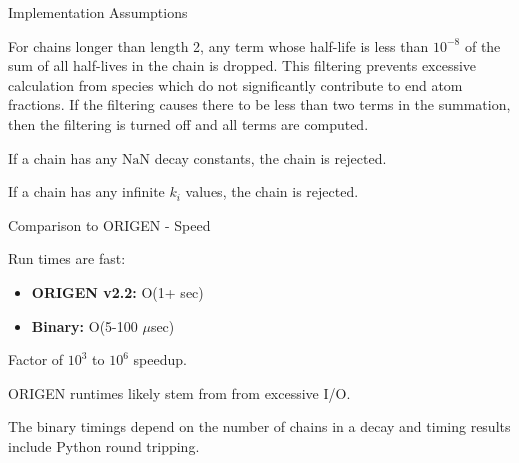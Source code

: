 \documentclass[xcolor=x11names,compress]{beamer}
\begin{document}

\begin{frame}{Implementation Assumptions}

    \vspace*{1em}
    For chains longer than length 2, any 
    term whose half-life is less than $10^{-8}$ of the sum of all 
    half-lives in the chain is dropped. This filtering prevents excessive
    calculation from species which do not significantly contribute to 
    end atom fractions. If the filtering causes there to be less than 
    two terms in the summation, then the filtering is turned off and all
    terms are computed.

    \vspace*{1em}
    If a chain has any $\mathrm{NaN}$ decay constants, the chain is rejected.

    \vspace*{1em}
    If a chain has any infinite $k_i$ values, the chain is rejected.

\end{frame}



\begin{frame}{Comparison to ORIGEN - Speed}

    Run times are fast:
    \vspace*{1em}
    \begin{itemize}
        \item \textbf{ORIGEN v2.2:} O(1+ sec)
        \item \textbf{Binary:} O(5-100 $\mu$sec)
    \end{itemize}

    \vspace*{1em}
    Factor of $10^3$ to $10^6$ speedup.

    \vspace*{1em}
    ORIGEN runtimes likely stem from from excessive I/O. 

    \vspace*{1em}
    The binary timings depend on the number of chains in a decay and 
    timing results include Python round tripping.

\end{frame}

\end{document}
